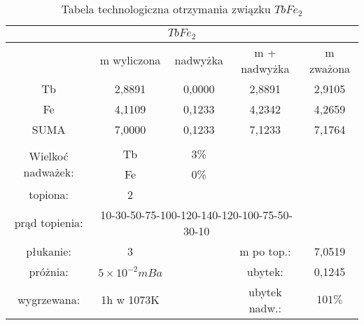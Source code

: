 \documentclass[a4paper,12pt]{article}
\numberwithin{equation}{section}
\begin{document}
\begin{appendices}
\begin{table}[!ht]
\footnotesize
\caption{Tabela technologiczna otrzymania związku $TbFe_{2}$ }
\label{Tbtechno}
\begin{tabular}{|c|c|c|c|c|}
\hline
\multicolumn{5}{|c|}{$TbFe_{2} $}\\\hline\hline
	& m wyliczona		&	nadwyżka	& m + nadwyżka	&	m zważona \\\hline
Tb	&	2,8891	&	0,0000	&	2,8891	&	2,9105	\\\hline
Fe	&	4,1109	&	0,1233	&	4,2342	&	4,2659	\\\hline
SUMA	&	7,0000	&	0,1233	&	7,1233	&	7,1764	\\\hline
\multicolumn{5}{|c|}{}\\\cline{1-3}
\multirow{2}{*}{Wielkoć nadważek:}	
	&	Tb 	&	3\%	& 	\multicolumn{2}{c|}{}\\\cline{2-3}	
	&	Fe	&	0\%	&	\multicolumn{2}{c|}{}\\\cline{1-3}
\multicolumn{1}{|c}{topiona:}	&	\multicolumn{1}{c|}{2} 	&	\multicolumn{3}{c|}{}\\\cline{1-4}
\multicolumn{1}{|c}{prąd topienia:}	&	\multicolumn{3}{c|}{10-30-50-75-100-120-140-120-100-75-50-30-10}	&	\\\cline{1-5}
\multicolumn{1}{|c}{płukanie:}	&	\multicolumn{1}{c|}{3}	&	&	\multicolumn{1}{c}{m po top.:}	&	\multicolumn{1}{c|}{7,0519} 	 	\\\cline{1-2}\cline{4-5}
\multicolumn{1}{|c}{próżnia:}	&	\multicolumn{1}{c|}{$5\times10^{-2}mBa$}	&	&	\multicolumn{1}{c}{ubytek:}	&	\multicolumn{1}{c|}{0,1245} 	 	\\\cline{1-2}\cline{4-5}
\multicolumn{1}{|c}{wygrzewana:}	&	\multicolumn{1}{c|}{1h w 1073K }	&	&	\multicolumn{1}{c}{ubytek nadw.:}	&	\multicolumn{1}{c|}{$101\%$} 	 	\\\hline
\end{tabular}
\end{table}


\end{appendices}
\end{document}
